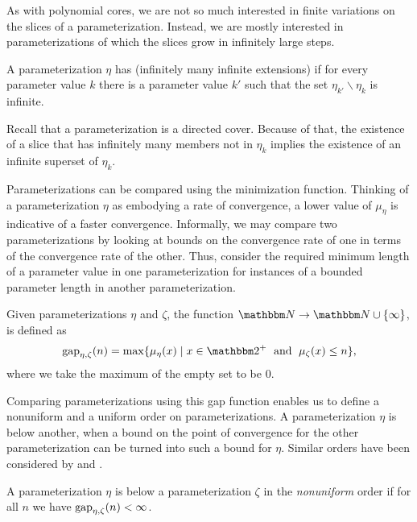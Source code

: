 As with polynomial cores, we are not so much interested in finite variations on the slices of a parameterization.
Instead, we are mostly interested in parameterizations of which the slices grow in infinitely large steps.
\begin{definition}
  A parameterization $\eta$ has  (infinitely many infinite extensions) if for every parameter value $k$ there is a parameter value $k'$ such that the set $\eta_{k'} \backslash \eta_k$ is infinite.
\end{definition}

Recall that a parameterization is a directed cover.
Because of that, the existence of a slice that has infinitely many members not in $\eta_k$ implies the existence of an infinite superset of $\eta_k$.

Parameterizations can be compared using the minimization function.
Thinking of a parameterization $\eta$ as embodying a rate of convergence, a lower value of $\mu_\eta$ is indicative of a faster convergence.
Informally, we may compare two parameterizations by looking at bounds on the convergence rate of one in terms of the convergence rate of the other.
Thus, consider the required minimum length of a parameter value in one parameterization for instances of a bounded parameter length in another parameterization.
\begin{definition}
  Given parameterizations $\eta$ and $\zeta$, the  function $\bbN \to \bbN \cup \{\infty\}$, is defined as
  \begin{equation*}
    \gap_{\eta, \zeta}(n) \deq \max\{\mu_{\eta}(x) \st x \in \binary^+ \reland \mu_{\zeta}(x) \le n\},
  \end{equation*}
  where we take the maximum of the empty set to be $0$.
\end{definition}

Comparing parameterizations using this gap function enables us to define a nonuniform and a uniform order on parameterizations.
A parameterization $\eta$ is below another, when a bound on the point of convergence for the other parameterization can be turned into such a bound for $\eta$.
Similar orders have been considered by \textcite{komusiewicz2012new} and \textcite{fellows2013towards}.

\begin{definition}
  A parameterization $\eta$ is below a parameterization $\zeta$ in the \emph{nonuniform} order  if for all $n$ we have $\operatorname{gap}_{\eta, \zeta}(n) < \infty$.
\end{definition}

